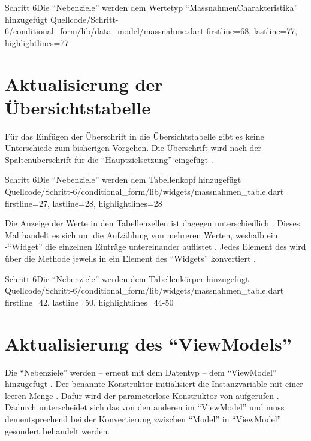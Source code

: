 \begin{alexlisting}{Schritt 6}{Die \enquote{Nebenziele} werden dem Wertetyp \enquote{MassnahmenCharakteristika} hinzugefügt}
  {Quellcode/Schritt-6/conditional_form/lib/data_model/massnahme.dart}
  {firstline=68, lastline=77, highlightlines={77}}
  \label{lst:Schritt6MassnahmenCharakteristika}
\end{alexlisting}


\clearpage
\section{Aktualisierung der Übersichtstabelle}

Für das Einfügen der Überschrift in die Übersichtstabelle gibt es keine Unterschiede zum bisherigen Vorgehen.
Die Überschrift wird nach der Spaltenüberschrift für die \enquote{Hauptzielsetzung} eingefügt .

\begin{alexlisting}{Schritt 6}{Die \enquote{Nebenziele} werden dem Tabellenkopf hinzugefügt}
  {Quellcode/Schritt-6/conditional_form/lib/widgets/massnahmen_table.dart}
  {firstline=27, lastline=28, highlightlines={28}}
  \label{lst:Schritt6buildColumnHeader}
\end{alexlisting}

Die Anzeige der Werte in den Tabellenzellen ist dagegen unterschiedlich \Lst{\ref{lst:Schritt6buildSelectableCell}}.
Dieses Mal handelt es sich um die Aufzählung von mehreren Werten,
weshalb ein -\enquote{Widget} die einzelnen Einträge untereinander auflistet .
Jedes Element des    wird über die Methode  jeweils in ein Element des \enquote{Widgets}  konvertiert .

\begin{alexlisting}{Schritt 6}{Die \enquote{Nebenziele} werden dem Tabellenkörper hinzugefügt}
  {Quellcode/Schritt-6/conditional_form/lib/widgets/massnahmen_table.dart}
  {firstline=42, lastline=50, highlightlines={44-50}}
  \label{lst:Schritt6buildSelectableCell}
\end{alexlisting}

\section{Aktualisierung des \enquote{ViewModels}}

Die \enquote{Nebenziele} werden -- erneut mit dem Datentyp  -- dem \enquote{ViewModel} hinzugefügt \Lst{\ref{lst:Schritt6BehaviorSubjectNebenziele}}.
Der benannte Konstruktor  initialisiert die Instanzvariable mit  einer leeren Menge .
Dafür wird der parameterlose Konstruktor von  aufgerufen .
Dadurch unterscheidet sich das  von den anderen im \enquote{ViewModel}
und muss dementsprechend bei der Konvertierung zwischen \enquote{Model} in \enquote{ViewModel} gesondert behandelt werden.

